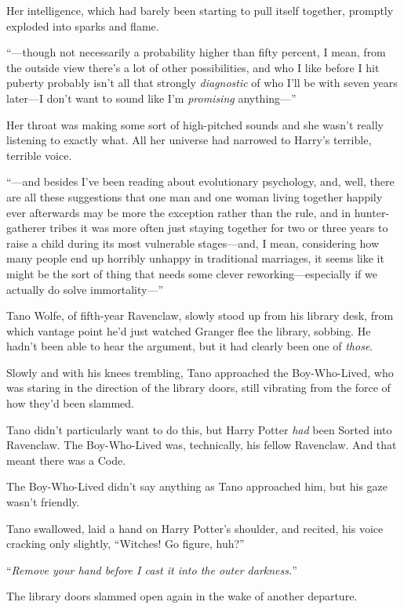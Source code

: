Her intelligence, which had barely been starting to pull itself together, promptly exploded into sparks and flame.

“—though not necessarily a probability higher than fifty percent, I mean, from the outside view there’s a lot of other possibilities, and who I like before I hit puberty probably isn’t all that strongly \emph{diagnostic} of who I’ll be with seven years later—I don’t want to sound like I’m \emph{promising} anything—”

Her throat was making some sort of high-pitched sounds and she wasn’t really listening to exactly what. All her universe had narrowed to Harry’s terrible, terrible voice.

“—and besides I’ve been reading about evolutionary psychology, and, well, there are all these suggestions that one man and one woman living together happily ever afterwards may be more the exception rather than the rule, and in hunter-gatherer tribes it was more often just staying together for two or three years to raise a child during its most vulnerable stages—and, I mean, considering how many people end up horribly unhappy in traditional marriages, it seems like it might be the sort of thing that needs some clever reworking—especially if we actually do solve immortality—”

\later

Tano Wolfe, of fifth-year Ravenclaw, slowly stood up from his library desk, from which vantage point he’d just watched Granger flee the library, sobbing. He hadn’t been able to hear the argument, but it had clearly been one of \emph{those}.

Slowly and with his knees trembling, Tano approached the Boy-Who-Lived, who was staring in the direction of the library doors, still vibrating from the force of how they’d been slammed.

Tano didn’t particularly want to do this, but Harry Potter \emph{had} been Sorted into Ravenclaw. The Boy-Who-Lived was, technically, his fellow Ravenclaw. And that meant there was a Code.

The Boy-Who-Lived didn’t say anything as Tano approached him, but his gaze wasn’t friendly.

Tano swallowed, laid a hand on Harry Potter’s shoulder, and recited, his voice cracking only slightly, “Witches! Go figure, huh?”

“\emph{Remove your hand before I cast it into the outer darkness.}”

The library doors slammed open again in the wake of another departure.

